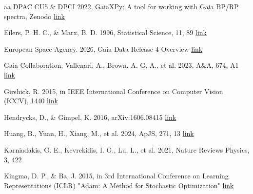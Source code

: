 \documentclass{aa}
\begin{document}
\begin{thebibliography}{aa}
    DPAC CU5 \& DPCI 2022, GaiaXPy: A tool for working with Gaia BP/RP spectra, Zenodo
    \href{https://www.cosmos.esa.int/web/gaia/gaiaxpy}{link}

    Eilers, P. H. C., \& Marx, B. D. 1996, Statistical Science, 11, 89
    \href{https://www.scirp.org/reference/referencespapers?referenceid=3333682}{link}

    European Space Agency. 2026, Gaia Data Release 4 Overview
    \href{https://www.cosmos.esa.int/web/gaia/dr4}{link}

    Gaia Collaboration, Vallenari, A., Brown, A. G. A., et al. 2023, A\&A, 674, A1
    \href{https://www.aanda.org/articles/aa/abs/2023/06/aa43940-22/aa43940-22.html}{link}
    
    Girshick, R. 2015, in IEEE International Conference on Computer Vision (ICCV), 1440 \href{https://openaccess.thecvf.com/content_iccv_2015/html/Girshick_Fast_R-CNN_ICCV_2015_paper.html}{link}
    
    Hendrycks, D., \& Gimpel, K. 2016, arXiv:1606.08415
    \href{https://arxiv.org/abs/1606.08415}{link}
    
    Huang, B., Yuan, H., Xiang, M., et al. 2024, ApJS, 271, 13 \href{https://ui.adsabs.harvard.edu/abs/2024ApJS..271...13H/abstract}{link}

    Karniadakis, G. E., Kevrekidis, I. G., Lu, L., et al. 2021, Nature Reviews Physics, 3, 422
    
    Kingma, D. P., \& Ba, J. 2015, in 3rd International Conference on Learning Representations (ICLR) "Adam: A Method for Stochastic Optimization"
    \href{https://arxiv.org/abs/1412.6980}{link}
    

\end{thebibliography}
\end{document}

